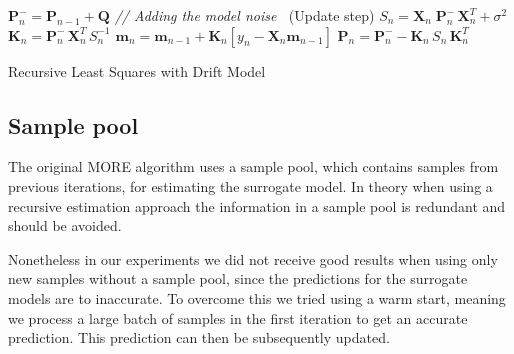 \begin{algorithm}[H]
\renewcommand{\algorithmcfname}{Algorithm}
\DontPrintSemicolon
\SetAlgoLined
{}

{
  $\mathbf{P}_n^- = \mathbf{P}_{n-1} + \mathbf{Q}$
  \textit{  // Adding the model noise}\;
  $~$ \;
  \Begin(Update step)
  {
    $S_n = \mathbf{X}_n \; \mathbf{P}_n^- \, \mathbf{X}_n^T + \sigma^2$ \;
    $\textbf{K}_n = \textbf{P}_{n}^{-} \, \textbf{X}^T_n \, S_n^{-1}$ \;
    $\textbf{m}_n = \textbf{m}_{n-1} + \textbf{K}_n [y_n - \textbf{X}_n \textbf{m}_{n-1}]$ \;
    $\textbf{P}_n = \textbf{P}_{n}^{-} - \textbf{K}_n \, S_n \, \textbf{K}_n^T $ \;
  }
}
\caption{Recursive Least Squares with Drift Model}
\label{RLS:basic}
\end{algorithm}
  
\subsection{Sample pool}
The original MORE algorithm uses a sample pool, which contains samples
from previous iterations, for estimating the surrogate model.
In theory when using a recursive estimation approach
the information in a sample pool is redundant and should be avoided.

Nonetheless in our experiments we did not receive good results when
using only new samples without a sample pool, since
the predictions for the surrogate models are to inaccurate.
To overcome this we tried using a warm start, meaning we
process a large batch of samples in the first iteration to get 
an accurate prediction. This prediction can then be subsequently
updated.

